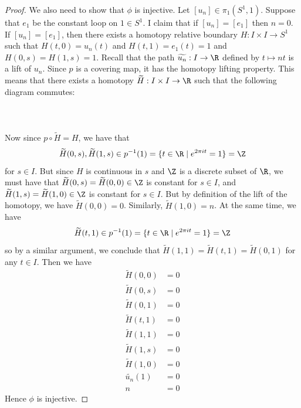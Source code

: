\documentclass[a4paper]{article}
\begin{document}
\begin{thm}{}{}
\begin{proof}
We also need to show that $\phi$ is injective. Let $[u_n]\in\pi_1(S^1,1)$. Suppose that $e_1$ be the constant loop on $1\in S^1$. I claim that if $[u_n]=[e_1]$ then $n=0$. If $[u_n]=[e_1]$, then there exists a homotopy relative boundary $H:I\times I\to S^1$ such that $H(t,0)=u_n(t)$ and $H(t,1)=e_1(t)=1$ and $H(0,s)=H(1,s)=1$. Recall that the path $\widetilde{u_n}:I\to\R$ defined by $t\mapsto nt$ is a lift of $u_n$. Since $p$ is a covering map, it has the homotopy lifting property. This means that there exists a homotopy $\widetilde{H}:I\times I\to\R$ such that the following diagram commutes: \\~\\
 \\~\\
Now since $p\circ\widetilde{H}=H$, we have that $$\widetilde{H}(0,s),\widetilde{H}(1,s)\in p^{-1}(1)=\{t\in\R\;|\;e^{2\pi it}=1\}=\Z$$ for $s\in I$. But since $H$ is continuous in $s$ and $\Z$ is a discrete subset of $\R$, we must have that $\widetilde{H}(0,s)=\widetilde{H}(0,0)\in\Z$ is constant for $s\in I$, and $\widetilde{H}(1,s)=\widetilde{H}(1,0)\in\Z$ is constant for $s\in I$. But by definition of the lift of the homotopy, we have $\widetilde{H}(0,0)=0$. Similarly, $\widetilde{H}(1,0)=n$. At the same time, we have $$\widetilde{H}(t,1)\in p^{-1}(1)=\{t\in\R\;|\;e^{2\pi it}=1\}=\Z$$ so by a similar argument, we conclude that $\widetilde{H}(1,1)=\widetilde{H}(t,1)=\widetilde{H}(0,1)$ for any $t\in I$. Then we have 
\begin{align*}
\widetilde{H}(0,0)&=0\\
\widetilde{H}(0,s)&=0\tag{for any $s\in I$}\\
\widetilde{H}(0,1)&=0\\
\widetilde{H}(t,1)&=0\tag{for any $t\in I$}\\
\widetilde{H}(1,1)&=0\\
\widetilde{H}(1,s)&=0\tag{for any $s\in I$}\\
\widetilde{H}(1,0)&=0\\
\widetilde{u_n}(1)&=0\\
n&=0
\end{align*}
Hence $\phi$ is injective. 
\end{proof}
\end{thm}
\end{document}

